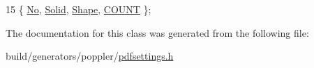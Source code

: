 \begin{DoxyCode}
15 \{ \hyperlink{classPDFSettings_1_1EnumEnhanceThinLines_a654750972bfae3ed1f24a3c7a26f48d8a549d2d50af8c8565cc95969502fc15d3}{No}, \hyperlink{classPDFSettings_1_1EnumEnhanceThinLines_a654750972bfae3ed1f24a3c7a26f48d8a6ed4b73013058427a1842e0f07b832b0}{Solid}, \hyperlink{classPDFSettings_1_1EnumEnhanceThinLines_a654750972bfae3ed1f24a3c7a26f48d8af39e4994f60336bd6fec32185c9367d9}{Shape}, \hyperlink{classPDFSettings_1_1EnumEnhanceThinLines_a654750972bfae3ed1f24a3c7a26f48d8a1fd4e5e0147b9d7484a83bd09f472802}{COUNT} \};
\end{DoxyCode}


The documentation for this class was generated from the following file\+:\begin{DoxyCompactItemize}
\item 
build/generators/poppler/\hyperlink{pdfsettings_8h}{pdfsettings.\+h}\end{DoxyCompactItemize}

